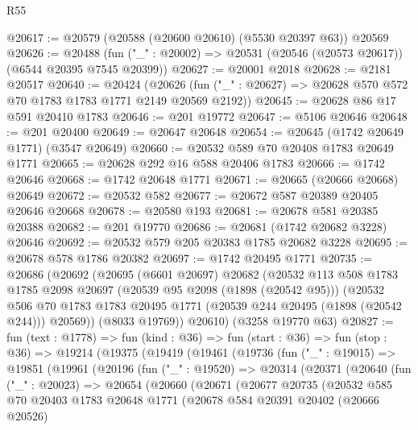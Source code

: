 \begin{lexlean}{R55}
\begin{coremodule}
@20617 := @20579 (@20588 (@20600 @20610) (@5530 @20397 @63)) @20569
@20626 := @20488 (fun ("_" : @20002) => @20531 (@20546 (@20573 @20617)) (@6544 @20395 @7545 @20399))
@20627 := @20001 @2018
@20628 := @2181 @20517
@20640 := @20424
    (@20626 (fun ("_" : @20627) => @20628 @570 @572 @70 @1783 @1783 @1771 @2149 @20569 @2192))
@20645 := @20628 @86 @17 @591 @20410 @1783
@20646 := @201 @19772
@20647 := @5106 @20646
@20648 := @201 @20400
@20649 := @20647 @20648
@20654 := @20645 (@1742 @20649 @1771) (@3547 @20649)
@20660 := @20532 @589 @70 @20408 @1783 @20649 @1771
@20665 := @20628 @292 @16 @588 @20406 @1783
@20666 := @1742 @20646
@20668 := @1742 @20648 @1771
@20671 := @20665 (@20666 @20668) @20649
@20672 := @20532 @582
@20677 := @20672 @587 @20389 @20405 @20646 @20668
@20678 := @20580 @193
@20681 := @20678 @581 @20385 @20388
@20682 := @201 @19770
@20686 := @20681 (@1742 @20682 @3228) @20646
@20692 := @20532 @579 @205 @20383 @1785 @20682 @3228
@20695 := @20678 @578 @1786 @20382
@20697 := @1742 @20495 @1771
@20735 := @20686
    (@20692
      (@20695
        (@6601 @20697)
        @20682
        (@20532
          @113
          @508
          @1783
          @1785
          @2098
          @20697
          (@20539 @95 @2098 (@1898 (@20542 @95)))
          (@20532
            @506
            @70
            @1783
            @1783
            @20495
            @1771
            (@20539 @244 @20495 (@1898 (@20542 @244)))
            @20569))
        (@8033 @19769))
      @20610)
    (@3258 @19770 @63)
@20827 := fun (text : @1778) =>
  fun (kind : @36) =>
  fun (start : @36) =>
  fun (stop : @36) =>
  @19214
    (@19375
      (@19419
        (@19461
          (@19736
            (fun ("_" : @19015) =>
            @19851
              (@19961
                (@20196
                  (fun ("_" : @19520) =>
                  @20314
                    (@20371
                      (@20640
                        (fun ("_" : @20023) =>
                        @20654
                          (@20660
                            (@20671
                              (@20677
                                @20735
                                (@20532
                                  @585
                                  @70
                                  @20403
                                  @1783
                                  @20648
                                  @1771
                                  (@20678
                                    @584
                                    @20391
                                    @20402
                                    (@20666 @20526)

\end{coremodule}
\end{lexlean}
